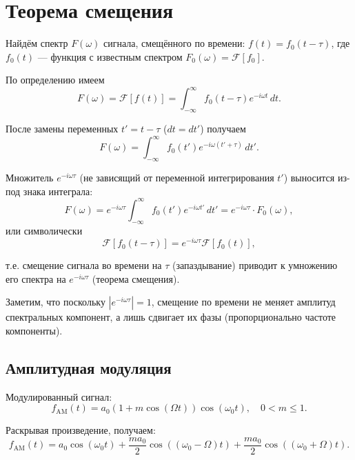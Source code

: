 \documentclass[a4paper]{article}
\begin{document}
\section*{Теорема смещения}

Найдём спектр $F(\omega)$ сигнала, смещённого по времени: $f(t) = f_0(t - \tau)$, где $f_0(t)$ — функция с известным спектром $F_0(\omega) = \mathcal{F}[f_0]$.

По определению имеем
\begin{equation}
F(\omega) = \mathcal{F}[f(t)] = \int_{-\infty}^{\infty} f_0(t - \tau) e^{-i\omega t}\, dt.
\end{equation}

После замены переменных $t' = t - \tau$ ($dt = dt'$) получаем
\begin{equation}
F(\omega) = \int_{-\infty}^{\infty} f_0(t') e^{-i\omega(t' + \tau)}\, dt'.
\end{equation}

Множитель $e^{-i\omega\tau}$ (не зависящий от переменной интегрирования $t'$) выносится из-под знака интеграла:
\begin{equation}
F(\omega) = e^{-i\omega\tau} \int_{-\infty}^{\infty} f_0(t') e^{-i\omega t'}\, dt' = e^{-i\omega\tau} \cdot F_0(\omega),
\end{equation}
или символически
\begin{equation}
\mathcal{F}[f_0(t - \tau)] = e^{-i\omega\tau} \mathcal{F}[f_0(t)],
\end{equation}

т.е. смещение сигнала во времени на $\tau$ (запаздывание) приводит к умножению его спектра на $e^{-i\omega\tau}$ (теорема смещения).

Заметим, что поскольку $|e^{-i\omega\tau}| = 1$, смещение по времени не меняет амплитуд спектральных компонент, а лишь сдвигает их фазы (пропорционально частоте компоненты).

\subsection*{Амплитудная модуляция}

Модулированный сигнал:
\begin{equation}
f_{\text{AM}}(t) = a_0 \left(1 + m \cos(\Omega t)\right) \cos(\omega_0 t), \quad 0 < m \leq 1.
\end{equation}

Раскрывая произведение, получаем:
\begin{equation}
f_{\text{AM}}(t) = a_0 \cos(\omega_0 t) + \frac{m a_0}{2} \cos\left((\omega_0 - \Omega)t\right) + \frac{m a_0}{2} \cos\left((\omega_0 + \Omega)t\right).
\end{equation}
\end{document}
